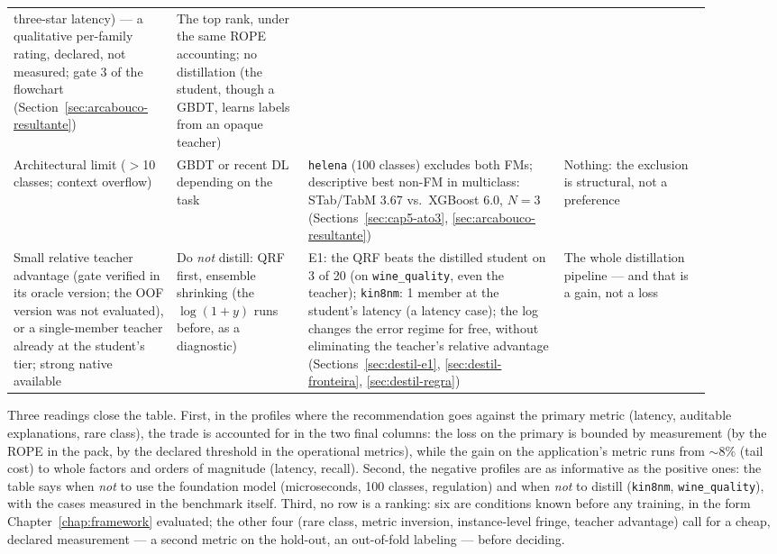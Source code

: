 \begin{table}[p]
\begin{tabular}{>{\raggedright\arraybackslash}p{0.21\linewidth}>{\raggedright\arraybackslash}p{0.17\linewidth}>{\raggedright\arraybackslash}p{0.33\linewidth}>{\raggedright\arraybackslash}p{0.19\linewidth}}
three-star latency) --- a qualitative per-family rating,
declared, not measured; gate 3 of the flowchart
(Section~\ref{sec:arcabouco-resultante}) &
The top rank, under the same ROPE accounting; no distillation (the
student, though a GBDT, learns labels from an opaque teacher) \\
\addlinespace[2.5pt]
Architectural limit ($>$10 classes; context overflow) &
GBDT or recent DL depending on the task &
\texttt{helena} (100 classes) excludes both FMs; descriptive
best non-FM in multiclass: STab/TabM 3.67 vs.\ XGBoost 6.0, $N{=}3$
(Sections~\ref{sec:cap5-ato3}, \ref{sec:arcabouco-resultante}) &
Nothing: the exclusion is structural, not a preference \\
\addlinespace[2.5pt]
Small relative teacher advantage (gate verified in its oracle
version; the OOF version was not evaluated), or a single-member
teacher already at the student's tier; strong
native
available &
Do \emph{not} distill: QRF first, ensemble
shrinking (the $\log(1{+}y)$ runs before, as a diagnostic) &
E1: the QRF beats the distilled student on 3 of 20 (on
\texttt{wine\_quality}, even the teacher); \texttt{kin8nm}: 1
member at the student's latency (a latency case); the log changes
the error regime
for free, without eliminating the teacher's relative advantage
(Sections~\ref{sec:destil-e1}, \ref{sec:destil-fronteira},
\ref{sec:destil-regra}) &
The whole distillation pipeline --- and that is a gain, not a loss \\
\bottomrule
\end{tabular}
\end{table}

Three readings close the table. First, in the profiles where the
recommendation goes against the primary metric (latency,
auditable explanations, rare class), the trade is accounted for in the two
final columns: the loss on the primary is bounded by measurement (by
the ROPE in the pack, by the declared threshold in the operational
metrics), while the gain on the application's metric runs from
${\sim}8\%$ (tail cost) to whole
factors and orders of magnitude (latency, recall). Second, the negative profiles are as
informative as the positive ones: the table says when \emph{not} to
use the foundation model (microseconds, 100 classes, regulation) and
when \emph{not} to distill (\texttt{kin8nm},
\texttt{wine\_\allowbreak quality}), with the cases measured in the
benchmark itself. Third, no row is a ranking: six are conditions
known before any training, in the form Chapter~\ref{chap:framework}
evaluated; the other four (rare class, metric inversion,
instance-level fringe, teacher advantage) call for a cheap, declared
measurement --- a second metric on the hold-out, an out-of-fold
labeling --- before deciding.

